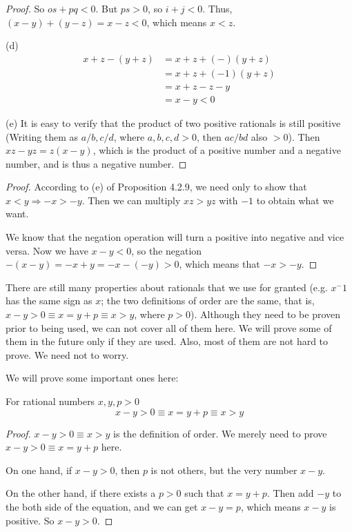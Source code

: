 \begin{proof}
So $os+pq<0$. But $ps>0$, so $i+j<0$. Thus, $(x-y) + (y-z) = x-z<0$, which means $x<z$.

(d)
\begin{align*}
x+z-(y+z) 
&= x+z + (-)(y+z) \\
&= x+z + (-1)(y+z) \\
&= x+z -z - y \\
&= x-y <0
\end{align*}

(e)
It is easy to verify that the product of two positive rationals is still positive (Writing them as 
$a/b,c/d$, where $a,b,c,d>0$, then $ac/bd$ also $>0$). Then $xz-yz=z(x-y)$, which is the product of a 
positive number and a negative number, and is thus a negative number.
\end{proof}

\begin{proof}
According to (e) of Proposition 4.2.9, we need only to show that $x<y \Longrightarrow -x>-y$. Then we can 
multiply $xz>yz$ with $-1$ to obtain what we want.

We know that the negation operation will turn a positive into negative and vice versa. Now we have 
$x-y<0$, so the negation $-(x-y) = -x+y = -x - (-y)>0$, which means that $-x>-y$.
\end{proof}

There are still many properties about rationals that we use for granted (e.g. $x^-1$ has the same sign as 
$x$; the two definitions of order are the same, that is, $x-y>0 \equiv x=y+p \equiv x>y$, where $p>0$). 
Although they need to be proven prior to being used, we can not cover all of them here. We will 
prove some of them in the future only if they are used. Also, most of them are not hard to prove. We need 
not to worry.

We will prove some important ones here:
\begin{prop} \label{prop.different.def.of.order}
For rational numbers $x,y,p>0$
\[
x-y>0 \equiv x=y+p \equiv x>y
\]
\end{prop}
\begin{proof}
$x-y>0 \equiv x>y$ is the definition of order. We merely need to prove $x-y>0 \equiv x=y+p$ here.

On one hand, if $x-y>0$, then $p$ is not others, but the very number $x-y$.

On the other hand, if there exists a $p>0$ such that $x=y+p$. Then add $-y$ to the both side of the 
equation, and we can get $x-y = p$, which means $x-y$ is positive. So $x-y>0$.
\end{proof}

